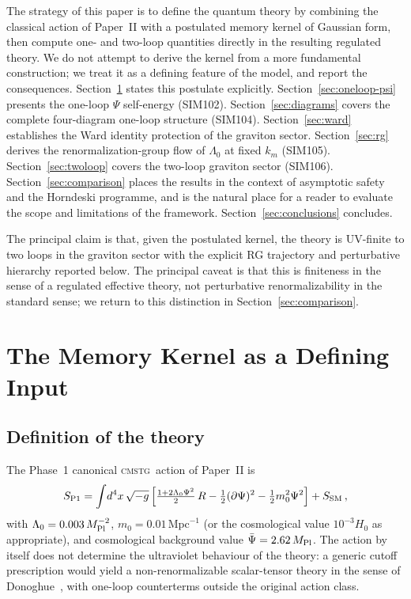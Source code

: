 \documentclass[12pt,a4paper]{article}
\newcommand{\CMSTG}{\textsc{cmstg}}
\newcommand{\Lz}{{\Lambda_0}}
\newcommand{\Mpl}{M_{\rm Pl}}
\newcommand{\Psibar}{\bar\Psi}
\newcommand{\km}{{k_m}}
\begin{document}
The strategy of this paper is to define the quantum theory by combining the
classical action of Paper~II with a postulated memory kernel of Gaussian form,
then compute one- and two-loop quantities directly in the resulting regulated
theory. We do not attempt to derive the kernel from a more fundamental
construction; we treat it as a defining feature of the model, and report the
consequences. Section~\ref{sec:kernel} states this postulate explicitly.
Section~\ref{sec:oneloop-psi} presents the one-loop $\Psi$ self-energy (SIM102).
Section~\ref{sec:diagrams} covers the complete four-diagram one-loop structure
(SIM104). Section~\ref{sec:ward} establishes the Ward identity protection of the
graviton sector. Section~\ref{sec:rg} derives the renormalization-group flow of
$\Lz$ at fixed $\km$ (SIM105). Section~\ref{sec:twoloop} covers the two-loop
graviton sector (SIM106). Section~\ref{sec:comparison} places the results in the
context of asymptotic safety and the Horndeski programme, and is the natural
place for a reader to evaluate the scope and limitations of the framework.
Section~\ref{sec:conclusions} concludes.

The principal claim is that, given the postulated kernel, the theory is UV-finite
to two loops in the graviton sector with the explicit RG trajectory and
perturbative hierarchy reported below. The principal caveat is that this is
finiteness in the sense of a regulated effective theory, not perturbative
renormalizability in the standard sense; we return to this distinction in
Section~\ref{sec:comparison}.

\section{The Memory Kernel as a Defining Input}
\label{sec:kernel}

\subsection{Definition of the theory}

The Phase~1 canonical \CMSTG\ action of Paper~II is
\begin{equation}
  S_{\rm P1} = \int\!d^4x\,\sqrt{-g}\,\Bigl[
    \tfrac{1+2\Lz\Psi^2}{2}\,R
    - \tfrac{1}{2}(\partial\Psi)^2
    - \tfrac{1}{2}m_0^2\Psi^2
  \Bigr] + S_{\rm SM}\,,
  \label{eq:action}
\end{equation}
with $\Lz = 0.003\,\Mpl^{-2}$, $m_0 = 0.01\,\mathrm{Mpc}^{-1}$ (or the
cosmological value $10^{-3}H_0$ as appropriate), and cosmological background
value $\Psibar = 2.62\,\Mpl$. The action by itself does not determine the
ultraviolet behaviour of the theory: a generic cutoff prescription would yield
a non-renormalizable scalar-tensor theory in the sense of
Donoghue~\cite{Donoghue1994}, with one-loop counterterms outside the original
action class.
\end{document}
